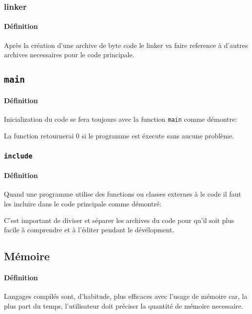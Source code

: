 \documentclass{article}
\begin{document}
\subsubsection{linker}
\paragraph{Définition}Après la création d'une archive de byte code le linker va faire reference à d'autres archives necessaires pour le code principale.

\subsection{\texttt{main}}
\paragraph{Définition}Inicialization du code se fera toujours avec la function \texttt{main} comme démontre:
\begin{scriptsize}
    \myStyleCPP
    
\end{scriptsize}
La function retournerai 0 si le programme est éxecute sans aucune problème.

\subsubsection{\texttt{include}}
\paragraph{Définition}Quand une programme utilise des functions ou classes externes à le code il faut les incluire dans le code principale comme démontré:
\begin{scriptsize}
    \myStyleCPP
    
\end{scriptsize}
C'est important de diviser et séparer les archives du code pour qu'il soit plus facile à comprendre et à l'éditer pendant le dévélopment.

\subsection{Mémoire}
\paragraph{Définition}Langages compilés sont, d'habitude, plus efficaces avec l'usage de mémoire car, la plus part du temps, l'utilisateur doit préciser la quantité de mémoire necessaire.
\end{document}
